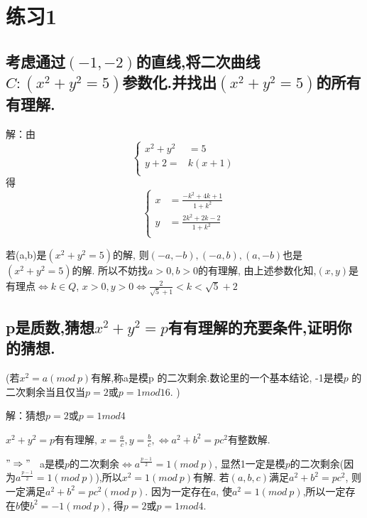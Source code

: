 \documentclass[UTF8]{book}
\begin{document}
	\section*{练习1}
		\subsection{考虑通过$ (-1,-2) $的直线,将二次曲线$C:(x^{2}+y^{2}=5)$参数化.并找出$(x^{2}+y^{2}=5)$的所有有理解.}
			解：由
				\begin{equation*}
				  \left\{
				   \begin{aligned}
				 x^{2}+y^{2} &=5 \\
				 y+2= &k(x+1)\\
				   \end{aligned}
				   \right.
				\end{equation*}
			得
				\begin{equation*}
				  \left\{
				   \begin{aligned}
				  x &=\frac{-k^{2}+4k+1}{1+k^{2}} \\
				  y &=\frac{2k^{2}+2k-2}{1+k^{2}}\\
				   \end{aligned}
				   \right.
				\end{equation*}
			
			
			若(a,b)是$(x^{2}+y^{2}=5)$的解, 则$ (-a,-b),(-a,b),(a,-b) $也是$(x^{2}+y^{2}=5)$的解. 所以不妨找$a>0, b>0$的有理解, 由上述参数化知,$ (x,y) $是有理点$\Leftrightarrow k\in Q$, $x>0, y>0\Leftrightarrow \frac{2}{\sqrt{5}+1}<k<\sqrt{5}+2$
			
		\subsection{p是质数,猜想$x^{2}+y^{2}=p$有有理解的充要条件,证明你的猜想. }
			(若$x^{2}=a(mod \ p)$有解,称a是模p 的二次剩余.数论里的一个基本结论, -1是模$ p $ 的二次剩余当且仅当$ p=2 $或$ p=1mod16 $. )
			
			解：猜想$ p=2 $或$ p=1mod 4 $
			
			
			 $x^{2}+y^{2}=p$有有理解, $x=\frac{a}{c},y=\frac{b}{c},\Leftrightarrow a^{2}+b^{2}=pc^{2}$有整数解.
			
			$"\Rightarrow"$ \ a是模$ p $的二次剩余$\Leftrightarrow a^{\frac{p-1}{2}}=1(mod \ p)$, 显然1一定是模$ p $的二次剩余(因为$a^{\frac{p-1}{2}}=1(mod \ p)$),所以$x^{2}=1(mod \ p)$有解. 若$ (a,b,c) $满足$a^{2}+b^{2}=pc^{2}$, 则一定满足$a^{2}+b^{2}=pc^{2}(mod \ p)$. 因为一定存在$ a $, 使$a^{2}=1(mod \ p)$,所以一定存在$ b $使$b^{2}=-1(mod \ p)$, 得$ p=2 $或$ p=1mod4 $.
			
\end{document}
